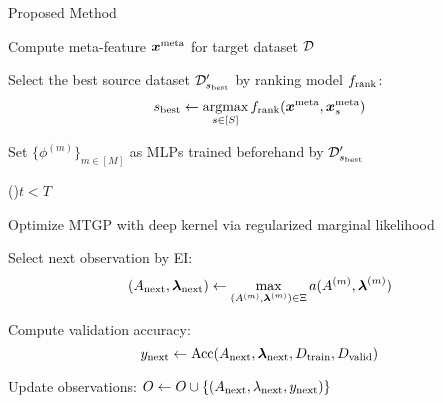 \begin{algorithm}[t]
 \caption{Proposed Method}
 \label{alg:proposed-method}




Compute meta-feature $\boldsymbol{x}^{\mathrm{meta}}$ for target dataset ${\mathcal D}$

Select the best source dataset ${\mathcal D}^\prime_{s_{\rm{best}}}$ by ranking model $f_{\mathrm{rank}}$:  
\[
    s_{\mathrm{best}} \leftarrow \mathop{\text{argmax}}_{s \in [S]} f_{\mathrm{rank}}(\boldsymbol{x}^{\mathrm{meta}}, \boldsymbol{x}_s^{\mathrm{meta}}) 
\] 

Set $\{ \phi^{(m)} \}_{m \in [M]}$ as MLPs trained beforehand by ${\mathcal D}^\prime_{s_{\mathrm{best}}}$  

\For(){$t < T$}{ 
    Optimize MTGP with deep kernel via regularized marginal likelihood 

    Select next observation by EI:  
    \[
        (A_{\mathrm{next}}, \boldsymbol{\lambda}_{\mathrm{next}}) \leftarrow \max_{(A^{(m)}, \boldsymbol{\lambda}^{(m)}) \in \Xi} a(A^{(m)}, \boldsymbol{\lambda}^{(m)}) 
    \]

    Compute validation accuracy:
    \[
        y_{\mathrm{next}} \leftarrow \mathrm{Acc}(A_{\mathrm{next}}, \boldsymbol{\lambda}_{\mathrm{next}}, D_{\mathrm{train}}, D_{\mathrm{valid}})
    \]

    Update observations:  
    $O \leftarrow O \cup \{(A_{\rm{next}}, {\lambda}_{\rm{next}}, y_{\rm{next}})\}$

}

\end{algorithm}
